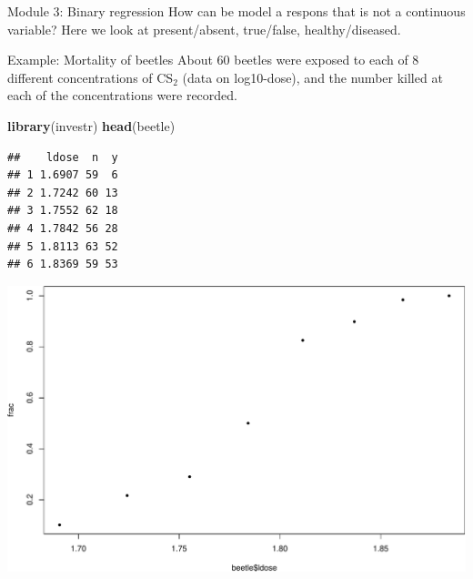 \documentclass[
  ignorenonframetext,
]{beamer}
\newenvironment{Shaded}{\begin{snugshade}}{\end{snugshade}}
\newcommand{\AttributeTok}[1]{\textcolor[rgb]{0.13,0.29,0.53}{#1}}
\newcommand{\DecValTok}[1]{\textcolor[rgb]{0.00,0.00,0.81}{#1}}
\newcommand{\FunctionTok}[1]{\textcolor[rgb]{0.13,0.29,0.53}{\textbf{#1}}}
\newcommand{\NormalTok}[1]{#1}
\newcommand{\OtherTok}[1]{\textcolor[rgb]{0.56,0.35,0.01}{#1}}
\newcommand{\SpecialCharTok}[1]{\textcolor[rgb]{0.81,0.36,0.00}{\textbf{#1}}}
\begin{document}
\begin{frame}[fragile]
\begin{block}{Module 3: Binary regression}
\protect\hypertarget{module-3-binary-regression}{}
How can be model a respons that is not a continuous variable? Here we
look at present/absent, true/false, healthy/diseased.

\begin{block}{Example: Mortality of beetles}
\protect\hypertarget{example-mortality-of-beetles}{}
About 60 beetles were exposed to each of 8 different concentrations of
CS\(_2\) (data on log10-dose), and the number killed at each of the
concentrations were recorded.

\begin{Shaded}
\begin{Highlighting}[]
\FunctionTok{library}\NormalTok{(investr)}
\FunctionTok{head}\NormalTok{(beetle)}
\end{Highlighting}
\end{Shaded}

\begin{verbatim}
##    ldose  n  y
## 1 1.6907 59  6
## 2 1.7242 60 13
## 3 1.7552 62 18
## 4 1.7842 56 28
## 5 1.8113 63 52
## 6 1.8369 59 53
\end{verbatim}

\begin{Shaded}
\end{Shaded}

\includegraphics{1Intro_files/figure-beamer/beetles-1.pdf}
\end{block}
\end{block}
\end{frame}
\end{document}
